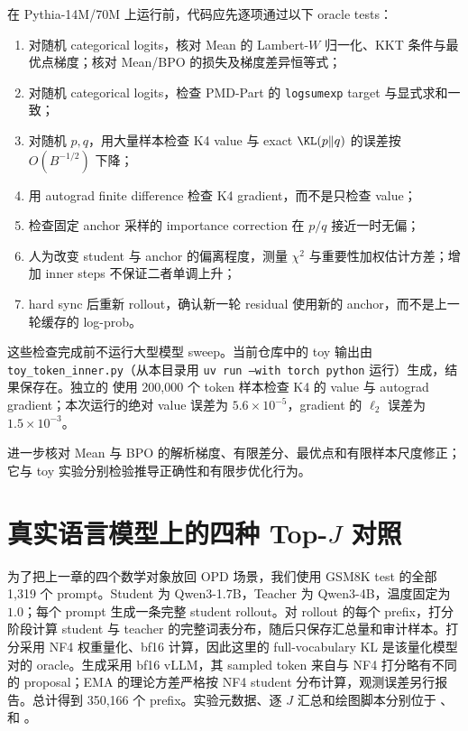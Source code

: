 在 Pythia-14M/70M 上运行前，代码应先逐项通过以下 oracle tests：

\begin{enumerate}
\item 对随机 categorical logits，核对 Mean 的 Lambert-$W$ 归一化、KKT 条件与最优点梯度；核对 Mean/BPO 的损失及梯度差异恒等式；
\item 对随机 categorical logits，检查 PMD-Part 的 \texttt{logsumexp} target 与显式求和一致；
\item 对随机 $p,q$，用大量样本检查 K4 value 与 exact $\KL(p\Vert q)$ 的误差按 $O(B^{-1/2})$ 下降；
\item 用 autograd finite difference 检查 K4 gradient，而不是只检查 value；
\item 检查固定 anchor 采样的 importance correction 在 $p/q$ 接近一时无偏；
\item 人为改变 student 与 anchor 的偏离程度，测量 $\chi^2$ 与重要性加权估计方差；增加 inner steps 不保证二者单调上升；
\item hard sync 后重新 rollout，确认新一轮 residual 使用新的 anchor，而不是上一轮缓存的 log-prob。
\end{enumerate}

这些检查完成前不运行大型模型 sweep。当前仓库中的 toy 输出由
\texttt{toy\_token\_inner.py}（从本目录用 \texttt{uv run --with torch python} 运行）生成，结果保存在。独立的
 使用 200,000 个 token 样本检查 K4 的 value 与 autograd gradient；本次运行的绝对 value 误差为 $5.6\times10^{-5}$，gradient 的 $\ell_2$ 误差为 $1.5\times10^{-3}$。

 进一步核对 Mean 与 BPO 的解析梯度、有限差分、最优点和有限样本尺度修正；它与 toy 实验分别检验推导正确性和有限步优化行为。

\section{真实语言模型上的四种 Top-$J$ 对照}

为了把上一章的四个数学对象放回 OPD 场景，我们使用 GSM8K test 的全部 1,319 个 prompt。Student 为 Qwen3-1.7B，Teacher 为 Qwen3-4B，温度固定为 $1.0$；每个 prompt 生成一条完整 student rollout。对 rollout 的每个 prefix，打分阶段计算 student 与 teacher 的完整词表分布，随后只保存汇总量和审计样本。打分采用 NF4 权重量化、bf16 计算，因此这里的 full-vocabulary KL 是该量化模型对的 oracle。生成采用 bf16 vLLM，其 sampled token 来自与 NF4 打分略有不同的 proposal；EMA 的理论方差严格按 NF4 student 分布计算，观测误差另行报告。总计得到 350,166 个 prefix。实验元数据、逐 $J$ 汇总和绘图脚本分别位于
、
 和
。

